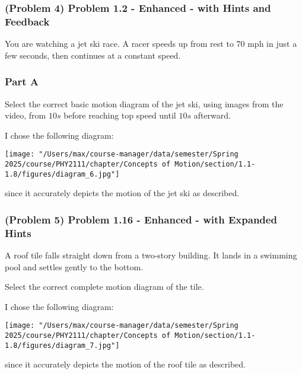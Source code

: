 \newpage

\subsubsection{(Problem 4) Problem 1.2 - Enhanced - with Hints and Feedback}

You are watching a jet ski race. A racer speeds up from rest to 70 mph in just a few seconds, then continues at a constant speed.

\subsubsection{Part A}
Select the correct basic motion diagram of the jet ski, using images from the video, from $10s$ before reaching top speed until $10s$ afterward.

\vspace{1em}

\begin{solution}

	I chose the following diagram:

	\begin{center}
		\texttt{[image: "/Users/max/course-manager/data/semester/Spring 2025/course/PHY2111/chapter/Concepts of Motion/section/1.1-1.8/figures/diagram\_6.jpg"]}
	\end{center}

	since it accurately depicts the motion of the jet ski as described.

\end{solution}

\newpage

\subsubsection{(Problem 5) Problem 1.16 - Enhanced - with Expanded Hints}

A roof tile falls straight down from a two-story building. It lands in a swimming pool and settles gently to the bottom.

Select the correct complete motion diagram of the tile.

\vspace{1em}

\begin{solution}

	I chose the following diagram:

	\begin{center}
		\texttt{[image: "/Users/max/course-manager/data/semester/Spring 2025/course/PHY2111/chapter/Concepts of Motion/section/1.1-1.8/figures/diagram\_7.jpg"]}
	\end{center}

	since it accurately depicts the motion of the roof tile as described.
\end{solution}

